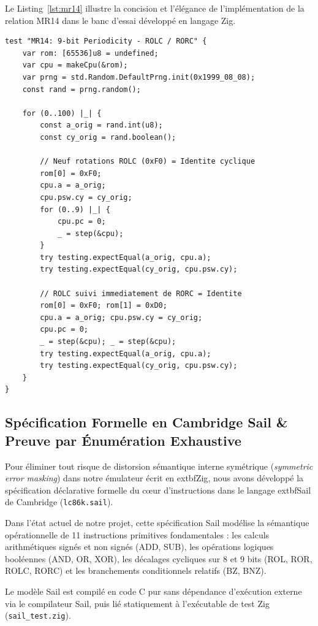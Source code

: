 \documentclass[10pt,journal,compsoc]{IEEEtran}
\begin{document}
Le Listing~\ref{lst:mr14} illustre la concision et l'élégance de l'implémentation de la relation MR14 dans le banc d'essai développé en langage Zig.

\begin{lstlisting}[caption={Implémentation en Zig de la Relation Métamorphique MR14 (Périodicité d'ordre 9 de ROLC sur l'anneau $\langle A, CY \rangle$).}, label={lst:mr14}]
test "MR14: 9-bit Periodicity - ROLC / RORC" {
    var rom: [65536]u8 = undefined;
    var cpu = makeCpu(&rom);
    var prng = std.Random.DefaultPrng.init(0x1999_08_08);
    const rand = prng.random();

    for (0..100) |_| {
        const a_orig = rand.int(u8);
        const cy_orig = rand.boolean();

        // Neuf rotations ROLC (0xF0) = Identite cyclique
        rom[0] = 0xF0;
        cpu.a = a_orig;
        cpu.psw.cy = cy_orig;
        for (0..9) |_| {
            cpu.pc = 0;
            _ = step(&cpu);
        }
        try testing.expectEqual(a_orig, cpu.a);
        try testing.expectEqual(cy_orig, cpu.psw.cy);

        // ROLC suivi immediatement de RORC = Identite
        rom[0] = 0xF0; rom[1] = 0xD0;
        cpu.a = a_orig; cpu.psw.cy = cy_orig;
        cpu.pc = 0;
        _ = step(&cpu); _ = step(&cpu);
        try testing.expectEqual(a_orig, cpu.a);
        try testing.expectEqual(cy_orig, cpu.psw.cy);
    }
}
\end{lstlisting}

\subsection{Spécification Formelle en Cambridge Sail \& Preuve par Énumération Exhaustive}
Pour éliminer tout risque de distorsion sémantique interne symétrique (\textit{symmetric error masking}) dans notre émulateur écrit en 	extbf{Zig}, nous avons développé la spécification déclarative formelle du cœur d'instructions dans le langage 	extbf{Sail} de Cambridge (\texttt{lc86k.sail}).

Dans l'état actuel de notre projet, cette spécification Sail modélise la sémantique opérationnelle de 11 instructions primitives fondamentales : les calculs arithmétiques signés et non signés (ADD, SUB), les opérations logiques booléennes (AND, OR, XOR), les décalages cycliques sur 8 et 9 bits (ROL, ROR, ROLC, RORC) et les branchements conditionnels relatifs (BZ, BNZ). 

Le modèle Sail est compilé en code C pur sans dépendance d'exécution externe via le compilateur Sail, puis lié statiquement à l'exécutable de test Zig (\texttt{sail\_test.zig}). 
\end{document}
